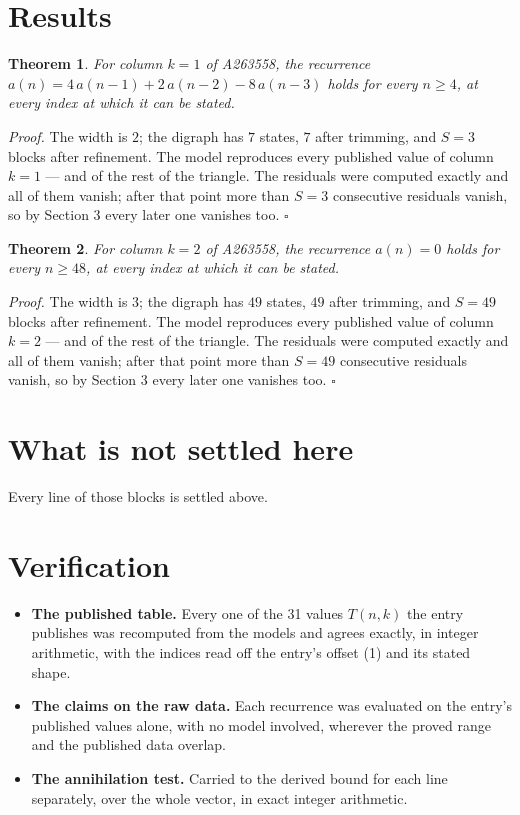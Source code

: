 \documentclass[11pt]{article}
\newtheorem{theorem}{Theorem}
\theoremstyle{definition}
\begin{document}
\section{Results}

\begin{theorem} For column $k = 1$ of A263558, the recurrence $a(n) = 4\,a(n-1) + 2\,a(n-2) - 8\,a(n-3)$ holds for every $n \ge 4$, at every index at which it can be stated.\end{theorem}

{\itshape Proof.} The width is $2$; the digraph has $7$ states, $7$ after trimming, and $S = 3$ blocks after refinement. The model reproduces every published value of column $k = 1$ --- and of the rest of the triangle. The residuals were computed exactly and all of them vanish; after that point more than $S = 3$ consecutive residuals vanish, so by Section 3 every later one vanishes too. $\square$

\begin{theorem} For column $k = 2$ of A263558, the recurrence $a(n) = 0$ holds for every $n \ge 48$, at every index at which it can be stated.\end{theorem}

{\itshape Proof.} The width is $3$; the digraph has $49$ states, $49$ after trimming, and $S = 49$ blocks after refinement. The model reproduces every published value of column $k = 2$ --- and of the rest of the triangle. The residuals were computed exactly and all of them vanish; after that point more than $S = 49$ consecutive residuals vanish, so by Section 3 every later one vanishes too. $\square$

\section{What is not settled here}

Every line of those blocks is settled above.

\section{Verification}

\begin{itemize}

\item {\bfseries The published table.} Every one of the 31 values $T(n,k)$ the entry publishes was recomputed from the models and agrees exactly, in integer arithmetic, with the indices read off the entry's offset (1) and its stated shape.

\item {\bfseries The claims on the raw data.} Each recurrence was evaluated on the entry's published values alone, with no model involved, wherever the proved range and the published data overlap.

\item {\bfseries The annihilation test.} Carried to the derived bound for each line separately, over the whole vector, in exact integer arithmetic.

\end{itemize}
\end{document}
